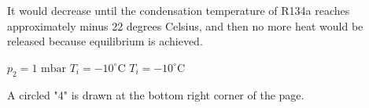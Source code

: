 It would decrease until the condensation temperature of R134a reaches approximately minus 22 degrees Celsius, and then no more heat would be released because equilibrium is achieved.

\( p_2 = \text{1 mbar} \)  
\( T_i = -10^\circ \text{C} \)  
\( T_i = -10^\circ \text{C} \)  

A circled "4" is drawn at the bottom right corner of the page.